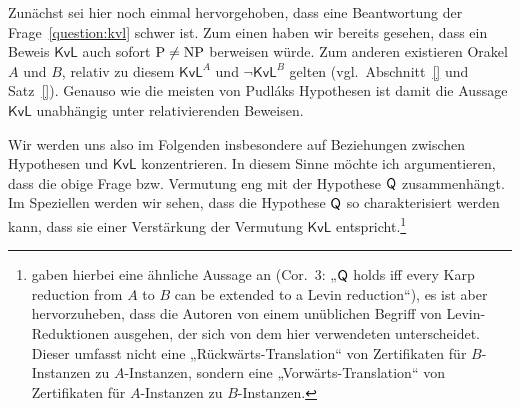 \questionkvl*

\conjkvl*

Zunächst sei hier noch einmal hervorgehoben, dass eine Beantwortung der Frage~\ref{question:kvl} schwer ist. Zum einen haben wir bereits gesehen, dass ein Beweis $\mathsf{KvL}$ auch sofort $\mathrm{P}\neq\mathrm{NP}$ berweisen würde. Zum anderen existieren Orakel $A$ und $B$, relativ zu diesem $\mathsf{KvL}^A$ und $\neg\mathsf{KvL}^B$ gelten (vgl.~Abschnitt~\ref{} und Satz~\ref{}). Genauso wie die meisten von Pudláks Hypothesen ist damit die Aussage $\mathsf{KvL}$ unabhängig unter relativierenden Beweisen.

Wir werden uns also im Folgenden insbesondere auf Beziehungen zwischen Hypothesen und $\mathsf{KvL}$ konzentrieren.
In diesem Sinne möchte ich argumentieren, dass die obige Frage bzw. Vermutung eng mit der Hypothese $\mathsf{Q}$ zusammenhängt.
Im Speziellen werden wir sehen, dass die Hypothese $\mathsf{Q}$ so charakterisiert werden kann, dass sie einer Verstärkung der Vermutung $\mathsf{KvL}$ entspricht.\footnote{\textcite{fenner_inverting_2003} gaben hierbei eine ähnliche Aussage an (Cor.~3: „$\mathsf{Q}$ holds iff every Karp reduction from $A$ to $B$ can be extended to a Levin reduction“), es ist aber hervorzuheben, dass die Autoren von einem unüblichen Begriff von Levin-Reduktionen ausgehen, der sich von dem hier verwendeten unterscheidet. Dieser umfasst nicht eine „Rückwärts-Translation“ von Zertifikaten für $B$-Instanzen zu $A$-Instanzen, sondern eine „Vorwärts-Translation“ von Zertifikaten für $A$-Instanzen zu $B$-Instanzen.}

